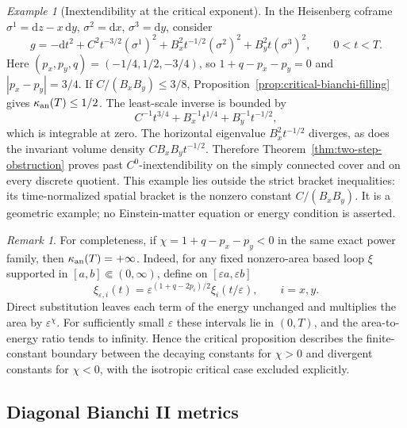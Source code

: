 \documentclass[10pt,a4paper]{article}
\numberwithin{equation}{section}
\theoremstyle{definition}
\theoremstyle{remark}
\newtheorem{remark}[theorem]{Remark}
\newtheorem{example}[theorem]{Example}
\newcommand{\dd}{\mathrm d}
\begin{document}
\begin{example}[Inextendibility at the critical exponent]
\label{ex:critical-inextendibility}
In the Heisenberg coframe
$\sigma^1=\dd z-x\,\dd y$, $\sigma^2=\dd x$, $\sigma^3=\dd y$,
consider
\[
 g=-\dd t^2+C^2t^{-3/2}(\sigma^1)^2
             +B_x^2t^{-1/2}(\sigma^2)^2
             +B_y^2t(\sigma^3)^2,
 \qquad 0<t<T.
\]
Here $(p_x,p_y,q)=(-1/4,1/2,-3/4)$, so
$1+q-p_x-p_y=0$ and $|p_x-p_y|=3/4$.  If
$C/(B_xB_y)\le3/8$, Proposition~\ref{prop:critical-bianchi-filling}
gives $\kappa_{\rm an}(T)\le1/2$.  The least-scale inverse is bounded
by
\[
 C^{-1}t^{3/4}+B_x^{-1}t^{1/4}+B_y^{-1}t^{-1/2},
\]
which is integrable at zero.  The horizontal eigenvalue
$B_x^2t^{-1/2}$ diverges, as does the invariant volume density
$CB_xB_y t^{-1/2}$.  Therefore
Theorem~\ref{thm:two-step-obstruction} proves past
$C^0$-inextendibility on the simply connected cover and on every
discrete quotient.  This example lies outside the strict bracket
inequalities: its time-normalized spatial bracket is the nonzero
constant $C/(B_xB_y)$.  It is a geometric example; no Einstein-matter
equation or energy condition is asserted.
\end{example}

\begin{remark}
For completeness, if $\chi=1+q-p_x-p_y<0$ in the same exact power
family, then $\kappa_{\rm an}(T)=+\infty$.  Indeed, for any fixed
nonzero-area based loop $\xi$ supported in $[a,b]\Subset(0,\infty)$,
define on $[\varepsilon a,\varepsilon b]$
\[
 \xi_{\varepsilon,i}(t)
     =\varepsilon^{(1+q-2p_i)/2}\xi_i(t/\varepsilon),
 \qquad i=x,y.
\]
Direct substitution leaves each term of the energy unchanged and
multiplies the area by $\varepsilon^\chi$.  For sufficiently small
$\varepsilon$ these intervals lie in $(0,T)$, and the area-to-energy
ratio tends to infinity.  Hence the critical proposition describes
the finite-constant boundary between the decaying constants for
$\chi>0$ and divergent constants for $\chi<0$, with the isotropic
critical case excluded explicitly.
\end{remark}

\subsection{Diagonal Bianchi II metrics}
\end{document}

